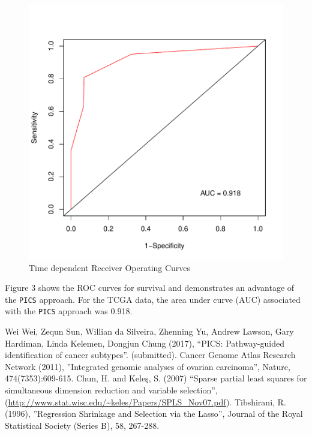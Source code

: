 \documentclass[11pt]{article}
\begin{document}
\begin{figure}[tbh]
\begin{center}
\includegraphics{PICS-example-plot3}
\caption{Time dependent Receiver Operating Curves}
\end{center}
\end{figure}

Figure 3 shows the ROC curves for survival and demonstrates an advantage of the \texttt{PICS} approach. For the TCGA data, the area under curve (AUC) associated with the \texttt{PICS} approach was 0.918.


\begin{thebibliography}{99}
 Wei Wei, Zequn Sun, Willian da Silveira, Zhenning Yu, Andrew Lawson, Gary Hardiman, Linda Kelemen, Dongjun Chung (2017), ``PICS: Pathway-guided identification of cancer subtypes''. (submitted).
 Cancer Genome Atlas Research Network (2011), ''Integrated genomic analyses of ovarian carcinoma'', Nature, 474(7353):609-615.
 Chun, H. and Kele\c{s}, S. (2007) ``Sparse partial least squares
  for simultaneous dimension reduction and variable selection'',
(\url{http://www.stat.wisc.edu/~keles/Papers/SPLS_Nov07.pdf}).
 Tibshirani, R. (1996), ''Regression Shrinkage and Selection via the Lasso'', Journal of the Royal Statistical Society (Series B), 58, 267-288.
\end{thebibliography}
\end{document}
